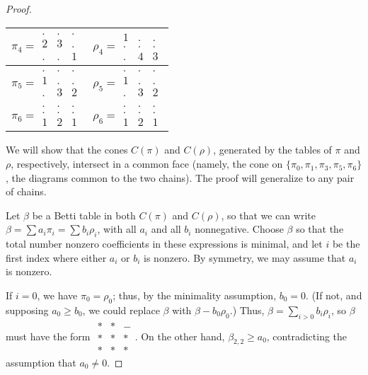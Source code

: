 \documentclass[12pt]{amsart}
\theoremstyle{plain}
\theoremstyle{definition}
\theoremstyle{remark}
\begin{document}
\begin{proof}
\begin{tabular}{c|c}
$\pi_4=\begin{array}{ccc}.&.&.\\2&3&.\\.&.&1\end{array}$&$\rho_4=\begin{array}{ccc}1&.&.\\.&.&.\\.&4&3\end{array}$\\\hline
$\pi_5=\begin{array}{ccc}.&.&.\\1&.&.\\.&3&2\end{array}$&$\rho_5=\begin{array}{ccc}.&.&.\\1&.&.\\.&3&2\end{array}$\\\hline
$\pi_6=\begin{array}{ccc}.&.&.\\.&.&.\\1&2&1\end{array}$&$\rho_6=\begin{array}{ccc}.&.&.\\.&.&.\\1&2&1\end{array}$\\\hline
\end{tabular}
We will show that the cones $C(\pi)$ and $C(\rho)$, generated by the
tables of $\pi$ and $\rho$, respectively, intersect in a common face
(namely, the cone on $\{\pi_0,\pi_1,\pi_3,\pi_5,\pi_6\}$, the diagrams
common to the two chains).  The proof will generalize to any pair of
chains.

Let $\beta$ be a Betti table in both $C(\pi)$ and $C(\rho)$, so that
we can write $\beta=\sum a_{i}\pi_{i}=\sum b_{i}\rho_{i}$, with all
$a_{i}$ and all $b_{i}$ nonnegative.  Choose $\beta$ so that the total
number nonzero coefficients in these expressions is minimal, and let
$i$ be the first index where either $a_{i}$ or $b_{i}$ is nonzero.  By
symmetry, we may assume that $a_{i}$ is nonzero.

If $i=0$, we have $\pi_{0}=\rho_{0}$; thus, by the minimality
assumption, $b_{0}=0$.  (If not, and supposing $a_{0}\geq b_{0}$, we
could replace $\beta$ with $\beta-b_{0}\rho_{0}$.)  Thus,
$\beta=\sum_{i>0}b_{i}\rho_{i}$, so $\beta$ must have the form
$\begin{array}{ccc}*&*&-\\*&*&*\\*&*&*\end{array}$.  On the other
hand, $\beta_{2,2}\geq a_{0}$, contradicting the assumption that
$a_{0}\neq 0$.


\end{proof}
\end{document}
